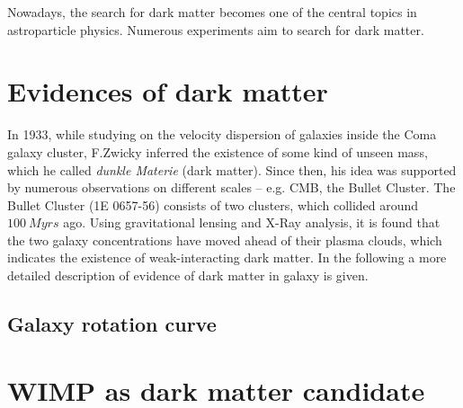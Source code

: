
Nowadays, the search for dark matter becomes one of the central topics in astroparticle physics.  Numerous experiments aim to search for dark matter.

\section{Evidences of dark matter}
In 1933, while studying on the velocity dispersion of galaxies inside the Coma galaxy cluster, F.Zwicky inferred the existence of some kind of unseen mass, which he called \textit{dunkle Materie} (dark matter). Since then, his idea was supported by numerous observations on different scales -- e.g. CMB, the Bullet Cluster.
The Bullet Cluster (1E 0657-56) consists of two clusters, which collided around $\SI{100}{Myrs}$ ago. Using gravitational lensing and X-Ray analysis, it is found that the two galaxy concentrations have moved ahead of their plasma clouds, which indicates the existence of weak-interacting dark matter.
In the following a more detailed description of evidence of dark matter in galaxy is given.
\subsection*{Galaxy rotation curve}



\section{WIMP as dark matter candidate}




